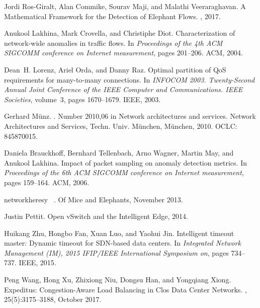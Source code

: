 \begin{thebibliography}{10}
Jordi Ros-Giralt, Alan Commike, Sourav Maji, and Malathi Veeraraghavan.
\newblock A {Mathematical} {Framework} for the {Detection} of {Elephant}
  {Flows}.
, 2017.

Anukool Lakhina, Mark Crovella, and Christiphe Diot.
\newblock Characterization of network-wide anomalies in traffic flows.
\newblock In {\em Proceedings of the 4th {ACM} {SIGCOMM} conference on
  {Internet} measurement}, pages 201--206. ACM, 2004.

Dean~H. Lorenz, Ariel Orda, and Danny Raz.
\newblock Optimal partition of {QoS} requirements for many-to-many connections.
\newblock In {\em {INFOCOM} 2003. {Twenty}-{Second} {Annual} {Joint}
  {Conference} of the {IEEE} {Computer} and {Communications}. {IEEE}
  {Societies}}, volume~3, pages 1670--1679. IEEE, 2003.

Gerhard M{\"u}nz.
.
\newblock Number 2010,06 in Network architectures and services. Network
  Architectures and Services, Techn. Univ. M{\"u}nchen, M{\"u}nchen, 2010.
\newblock OCLC: 845870015.

Daniela Brauckhoff, Bernhard Tellenbach, Arno Wagner, Martin May, and Anukool
  Lakhina.
\newblock Impact of packet sampling on anomaly detection metrics.
\newblock In {\em Proceedings of the 6th {ACM} {SIGCOMM} conference on
  {Internet} measurement}, pages 159--164. ACM, 2006.

networkheresy ~.
\newblock Of {Mice} and {Elephants}, November 2013.

Justin Pettit.
\newblock Open {vSwitch} and the {Intelligent} {Edge}, 2014.

Huikang Zhu, Hongbo Fan, Xuan Luo, and Yaohui Jin.
\newblock Intelligent timeout master: {Dynamic} timeout for {SDN}-based data
  centers.
\newblock In {\em Integrated {Network} {Management} ({IM}), 2015 {IFIP}/{IEEE}
  {International} {Symposium} on}, pages 734--737. IEEE, 2015.

Peng Wang, Hong Xu, Zhixiong Niu, Dongsu Han, and Yongqiang Xiong.
\newblock Expeditus: {Congestion}-{Aware} {Load} {Balancing} in {Clos} {Data}
  {Center} {Networks}.
, 25(5):3175--3188, October
  2017.


\end{thebibliography}
